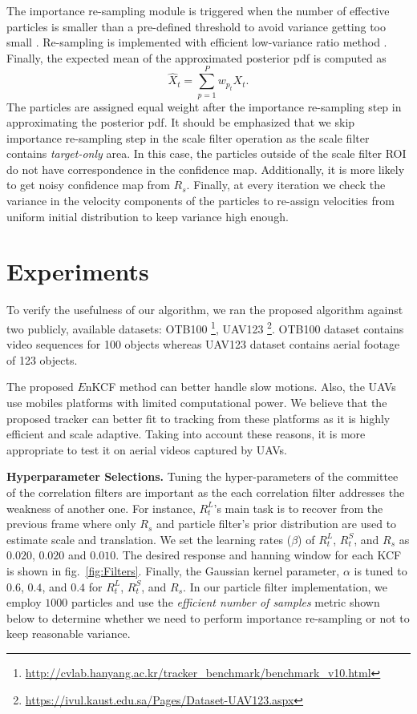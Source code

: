 \documentclass{bmvc2k}
\begin{document}
The importance re-sampling module is triggered when the number of effective particles
is smaller than a pre-defined threshold to avoid variance getting too small \cite{thrun2005probabilistic}. Re-sampling is implemented with efficient low-variance ratio method \cite{thrun2005probabilistic}. Finally, the expected mean of the approximated posterior pdf is computed as
\begin{equation}
	\hat{X}_{t} = \sum_{p=1}^{P}w_{p_{t}} X_{t}.
\end{equation}
The particles are assigned equal weight after the importance re-sampling step in approximating the posterior pdf. It should be emphasized that we skip importance re-sampling step in the scale filter 
operation as the scale filter contains \textit{target-only} area. In this case, the particles
outside of the scale filter ROI do not have correspondence in the confidence map. Additionally, it is more likely to get noisy confidence map from $R_{s}$. Finally, at every iteration we check the variance in the velocity components of the particles to re-assign velocities from uniform initial distribution to keep variance high enough.

\section{Experiments} \label{sc:Experiments}
To verify the usefulness of our algorithm, we ran the proposed
algorithm against two publicly, available datasets:
OTB100 \footnote{\url{http://cvlab.hanyang.ac.kr/tracker_benchmark/benchmark_v10.html}},
UAV123 \footnote{\url{https://ivul.kaust.edu.sa/Pages/Dataset-UAV123.aspx}}\cite{mueller2016uav123}. OTB100
dataset contains video sequences for 100 objects whereas UAV123
dataset contains aerial footage of 123 objects. 

The proposed $E$nKCF method can better handle slow motions. Also, the
UAVs use mobiles platforms with limited computational power. We
believe that the proposed tracker can better fit to tracking from
these platforms as it is highly efficient and scale adaptive. Taking
into account these reasons, it is more appropriate to test it on
aerial videos captured by UAVs.

\textbf{Hyperparameter Selections.} Tuning the hyper-parameters of the
committee of the correlation filters are important as the each
correlation filter addresses the weakness of another one. For
instance, $R_{t}^{L}$'s main task is to recover from the previous
frame where only $R_{s}$ and particle filter's prior distribution are
used to estimate scale and translation. We set the learning rates
($\beta$) of $R_{t}^{L}$, $R_{t}^{S}$, and $R_{s}$ as $0.020$, $0.020$
and $0.010$. The desired response and hanning window for each KCF is
shown in fig.~\ref{fig:Filters}. Finally, the Gaussian kernel
parameter, $\alpha$ is tuned to $0.6$, $0.4$, and $0.4$ for
$R_{t}^{L}$, $R_{t}^{S}$, and $R_{s}$. In our particle filter
implementation, we employ $1000$ particles and use the
\textit{efficient number of samples} metric shown below to determine
whether we need to perform importance re-sampling or not to keep
reasonable variance.
\end{document}
